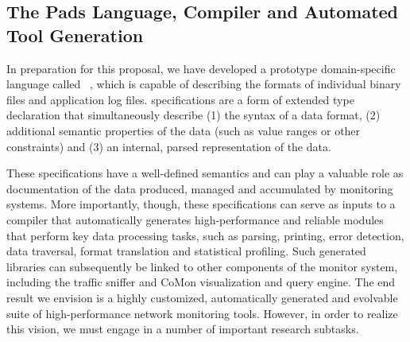 \subsection{The Pads Language, Compiler and Automated Tool Generation}

In preparation for this proposal, we have developed a prototype
domain-specific language called
\pads{}~\cite{fisher+:pads,fisher+:popl06,mandelbaum+:pads-ml}, 
which is capable of describing
the formats of individual binary files and application log files.
\pads{} specifications are a form of extended type declaration that
simultaneously describe (1) the syntax of a data format, (2) additional
semantic properties of the data (such as value ranges or other constraints)
and (3) an internal, parsed representation of the data.  


These specifications have a well-defined semantics and can play a
valuable role as documentation of the data produced, managed and
accumulated by monitoring systems.  More importantly, though, these
specifications can serve as inputs to a compiler that automatically
generates high-performance and reliable modules that perform key data
processing tasks, such as parsing, printing, error detection, data
traversal, format translation and statistical profiling.  Such
generated libraries can subsequently be linked to other components of
the monitor system, including the traffic sniffer and CoMon
visualization and query engine.  The end result we envision is a 
highly customized, automatically generated and evolvable
suite of high-performance network monitoring
tools.  However, in order to realize this vision, we must engage
in a number of important research subtasks. 

